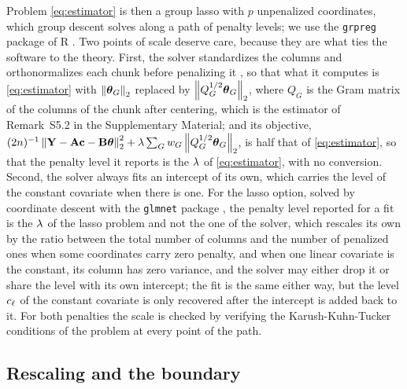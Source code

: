 Problem \eqref{eq:estimator} is then a group lasso with $p$ unpenalized coordinates,
which group descent \citep{Breheny-Huang-2015} solves along a path of penalty levels; we use the
\texttt{grpreg} package \citep{Breheny-Miller-grpreg-2026} of R
\citep{RCoreTeam-2026}. Two points of scale deserve care, because they are
what ties the software to the theory. First, the solver standardizes
the columns and orthonormalizes each chunk before penalizing it
\citep{Simon-Tibshirani-2012}, so that what
it computes is \eqref{eq:estimator} with $\left\lVert \boldsymbol{\theta}_{G} \right\rVert_{2}$ replaced by
$\left\lVert Q_{G}^{1/2}\boldsymbol{\theta}_{G} \right\rVert_{2}$, where $Q_{G}$ is the Gram matrix of the
columns of the chunk after centering, which is the estimator of Remark~S5.2 in
the Supplementary Material; and its objective,
$(2n)^{-1}\left\lVert \mathbf{Y} - \mathbf{A}\mathbf{c} - \mathbf{B}\boldsymbol{\theta} \right\rVert_{2}^{2} +
\lambda\sum_{G}w_{G}\left\lVert Q_{G}^{1/2}\boldsymbol{\theta}_{G} \right\rVert_{2}$, is half that of
\eqref{eq:estimator}, so that the penalty level it reports is the $\lambda$ of
\eqref{eq:estimator}, with no conversion. Second, the solver always fits an
intercept of its own, which carries the level of the constant covariate when
there is one. For the lasso option, solved by coordinate descent with the
\texttt{glmnet} package \citep{friedman2010regularization}, the penalty level reported for a
fit is the $\lambda$ of the lasso problem and not the one of the solver, which
rescales its own by the ratio between the total number of columns and the
number of penalized ones when some coordinates carry zero penalty, and when one linear
covariate is the constant, its column has zero variance, and the solver may
either drop it or share the level with its own intercept; the fit is the same
either way, but the level $c_{\ell}$ of the constant covariate is only
recovered after the intercept is added back to it. For both
penalties the scale is checked by verifying the Karush-Kuhn-Tucker conditions
of the problem at every point of the path.

\subsection{Rescaling and the boundary}
\label{sec:boundary}

